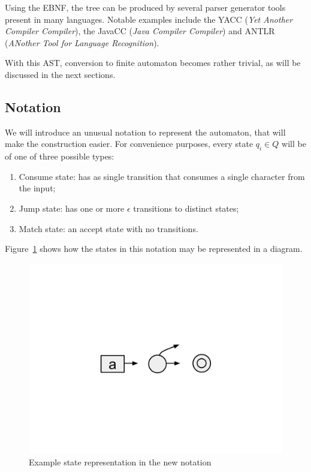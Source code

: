 \documentclass{llncs}
\begin{document}
Using the EBNF, the tree can be produced by several parser generator tools present in many languages. Notable examples include the YACC (\emph{Yet Another Compiler Compiler}), the JavaCC (\emph{Java Compiler Compiler}) and ANTLR (\emph{ANother Tool for Language Recognition}). 

With this AST, conversion to finite automaton becomes rather trivial, as will be discussed in the next sections.

\subsection{Notation}\label{sec:Notacao}

We will introduce an unusual notation to represent the automaton, that will make the construction easier. For convenience purposes, every state $q_i \in Q$ will be of one of three possible types:

\begin{enumerate}
    \item {\sc Consume} state: has as single transition that consumes a single character from the input;
    \item {\sc Jump} state: has one or more $\epsilon$ transitions to distinct states;
    \item {\sc Match} state: an accept state with no transitions.
\end{enumerate}

Figure~\ref{fig:nova_notacao} shows how the states in this notation may be represented in a diagram.

\begin{figure}[!htbp]
  \centering
  \includegraphics[trim=4in 4in 4in 4in, scale=0.30]{figures/new_notation.pdf}
  \caption{Example state representation in the new notation}
  \label{fig:nova_notacao}
\end{figure}
\end{document}
